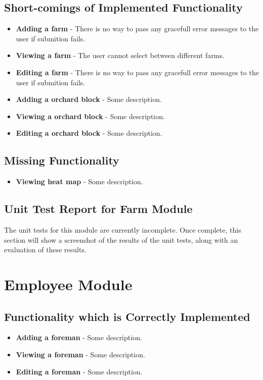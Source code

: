 \documentclass[11pt,fleqn]{book} %
\begin{document}
		\subsection{Short-comings of Implemented Functionality}
			\begin{itemize}
				\item\textbf{Adding a farm} -
				There is no way to pass any gracefull error messages to the user if submition fails.
				
				\item\textbf{Viewing a farm} -
				The user cannot select between different farms.
				
				\item\textbf{Editing a farm} -
				There is no way to pass any gracefull error messages to the user if submition fails.
				
				\item\textbf{Adding a orchard block} -
				Some description. 
				
				\item\textbf{Viewing a orchard block} -
				Some description.
				
				\item\textbf{Editing a orchard block} -
				Some description.
			\end{itemize}
		\subsection{Missing Functionality}
			\begin{itemize}
				\item\textbf{Viewing heat map} -
				Some description.
			\end{itemize}
		\subsection{Unit Test Report for Farm Module}
			The unit tests for this module are currently incomplete. Once complete, this section will show a screenshot of the results of the unit tests, along with an evaluation of these results.
	\section{Employee Module}
		\subsection{Functionality which is Correctly Implemented}
			\begin{itemize}
				\item\textbf{Adding a foreman} -
				Some description. 
				
				\item\textbf{Viewing a foreman} -
				Some description.
				
				\item\textbf{Editing a foreman} -
				Some description.
			\end{itemize}
\end{document}
